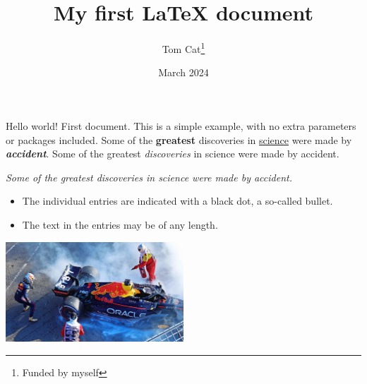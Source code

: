 \documentclass[12pt, letterpaper]{article}
\title{My first LaTeX document}
\author{Tom Cat\thanks{Funded by myself}}
\date{March 2024}
\begin{document}
\maketitle
Hello world!
First document. This is a simple example, with no
extra parameters or packages included.
Some of the \textbf{greatest}
discoveries in \underline{science}
were made by \textbf{\textit{accident}}.
Some of the greatest \emph{discoveries} in science 
were made by accident.

\textit{Some of the greatest \emph{discoveries} 
in science were made by accident.}


\begin{itemize}
    \item The individual entries are indicated with a black dot, a so-called bullet.
    \item The text in the entries may be of any length.
\end{itemize}

\includegraphics[width=0.5\textwidth]{GEEJj_kXYAImdwn}
\end{document}
